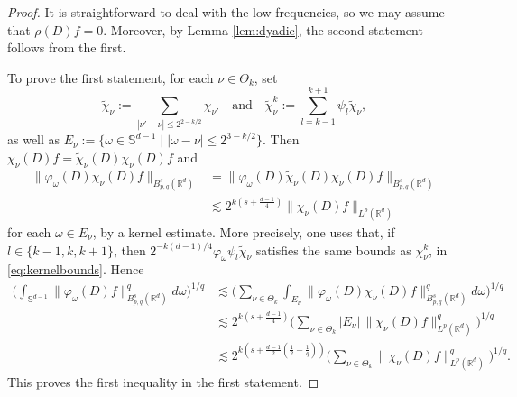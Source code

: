 \documentclass{amsart}
\theoremstyle{definition}
\newcommand {\Rd}{\mathbb{R}^{d}}
\newcommand {\w}{\omega}
\newcommand {\ph}{\varphi}
\newcommand{\Su}{\mathbb{S}}
\numberwithin{equation}{section}
\begin{document}
\begin{proof}
It is straightforward to deal with the low frequencies, so we may assume that $\rho(D)f=0$. Moreover, by Lemma \ref{lem:dyadic}, the second statement follows from the first.

To prove the first statement, for each $\nu\in\Theta_{k}$, set
\begin{equation}\label{eq:packets}
\tilde{\chi}_{\nu}:=\sum_{|\nu'-\nu|\leq 2^{2-k/2}}\chi_{\nu'}\quad\text{and}\quad\tilde{\chi}_\nu^{k} := \sum_{l=k-1}^{k+1} \psi_{l}\tilde{\chi}_\nu,
\end{equation}
as well as $E_{\nu}:=\{\w\in \Su^{d-1}\mid |\w-\nu|\leq 2^{3-k/2}\}$. Then $\chi_{\nu}(D)f=\tilde{\chi}_{\nu}(D)\chi_{\nu}(D)f$ and 
\begin{align*}
\| \varphi_\omega(D) \chi_\nu(D) f \|_{B^{s}_{p,q}(\Rd)}&=\| \varphi_\omega(D) \tilde{\chi}_{\nu}(D)\chi_\nu(D) f \|_{B^{s}_{p,q}(\Rd)} \\
&\lesssim 2^{k(s+\frac{d-1}{4})} \| \chi_\nu(D) f \|_{L^{p}(\Rd)}
\end{align*}
for each $\w\in E_{\nu}$, by a kernel estimate. More precisely, one uses that, if $l\in\{k-1,k,k+1\}$, then $2^{-k(d-1)/4}\varphi_\omega \psi_{l}\tilde{\chi}_\nu$ satisfies the same bounds as $\chi^k_\nu$, in \eqref{eq:kernelbounds}. Hence
\begin{equation*}
\begin{split}
\Big( \int_{\mathbb{S}^{d-1}} \|\ph_\w(D) f \|^q_{B^{s}_{p,q}(\Rd)} d\omega \Big)^{1/q}&\lesssim  \Big( \sum_{\nu\in\Theta_{k}} \int_{E_{\nu}} \| \varphi_\omega(D)\chi_{\nu}(D)f \|_{B^{s}_{p,q}(\Rd)}^q d\omega \Big)^{1/q} \\
&\lesssim 2^{k(s+\frac{d-1}{4})} \Big( \sum_{\nu \in\Theta_{k}} |E_\nu|\, \| \chi_\nu(D) f \|^q_{L^p(\Rd)} \Big)^{1/q} \\
&\lesssim 2^{k(s+\frac{d-1}{2}( \frac{1}{2} - \frac{1}{q}))} \Big( \sum_{\nu \in\Theta_{k}} \| \chi_\nu(D) f \|^q_{L^p(\Rd)} \Big)^{1/q}.
\end{split}
\end{equation*}
This proves the first inequality in the first statement. 


\end{proof}
\end{document}
